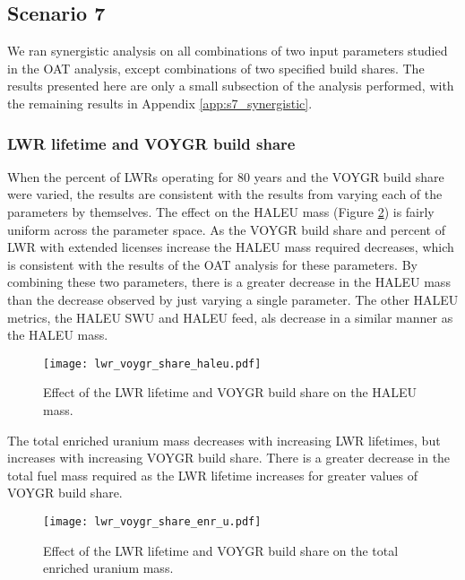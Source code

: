 \subsection{Scenario 7}\label{sec:s7_synergistic}
We ran synergistic 
analysis on all combinations of two input parameters studied in the \gls{OAT} 
analysis, except combinations of two specified build shares. The
results presented here are only a small subsection of the analysis performed, 
with the remaining results in Appendix \ref{app:s7_synergistic}.

\subsubsection{LWR lifetime and VOYGR build share}
When the percent of \glspl{LWR} operating for 80 years and the VOYGR build share 
were varied, the results are consistent with the results from varying 
each of the parameters by themselves. The effect on the \gls{HALEU} mass 
(Figure \ref{fig:lwr_voygr_share_enr_u}) is fairly uniform across the 
parameter space. As the VOYGR build share and percent of \gls{LWR} with 
extended licenses increase the \gls{HALEU} mass required decreases, 
which is consistent with the results of the \gls{OAT} analysis for these 
parameters. By combining these two parameters, there is a greater 
decrease in the \gls{HALEU} mass than the decrease observed by just varying 
a single parameter. The other \gls{HALEU} metrics, the \gls{HALEU} \gls{SWU} 
and \gls{HALEU} feed, als decrease in a similar manner as the \gls{HALEU} mass. 

\begin{figure}[ht]
    \centering
    \texttt{[image: lwr\_voygr\_share\_haleu.pdf]}
    \caption{Effect of the LWR lifetime and VOYGR build share on the HALEU mass.}
    \label{fig:lwr_voygr_share_haleu}
\end{figure}

The total enriched uranium mass decreases with increasing \gls{LWR} 
lifetimes, but increases with increasing VOYGR build share. There is a 
greater decrease in the total fuel mass required as the \gls{LWR} 
lifetime increases for greater values of VOYGR build share. 
\begin{figure}[ht]
    \centering
    \texttt{[image: lwr\_voygr\_share\_enr\_u.pdf]}
    \caption{Effect of the LWR lifetime and VOYGR build share on 
    the total enriched uranium mass.}
    \label{fig:lwr_voygr_share_enr_u}
\end{figure}

